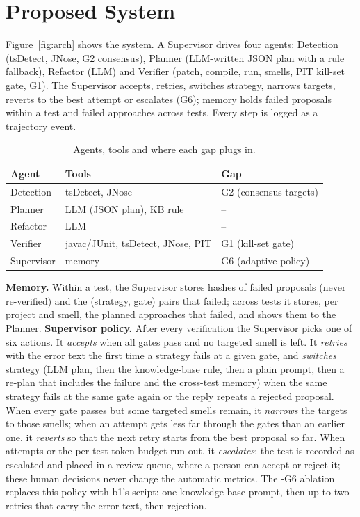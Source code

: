 \documentclass[conference]{IEEEtran}
\begin{document}
\section{Proposed System}
Figure~\ref{fig:arch} shows the system. A Supervisor drives four agents: Detection (tsDetect, JNose, G2 consensus),
Planner (LLM-written JSON plan with a rule fallback), Refactor (LLM) and Verifier (patch, compile, run, smells, PIT kill-set gate, G1).
The Supervisor accepts, retries, switches strategy, narrows targets, reverts to the best attempt or escalates (G6);
memory holds failed proposals within a test and failed approaches across tests. Every step is logged as a trajectory event.
\begin{table}[t]\centering\caption{Agents, tools and where each gap plugs in.}\label{tab:agents}\footnotesize
\begin{tabular}{@{}lll@{}}\toprule Agent & Tools & Gap\\\midrule
Detection & tsDetect, JNose & G2 (consensus targets)\\
Planner & LLM (JSON plan), KB rule & --\\
Refactor & LLM & --\\
Verifier & javac/JUnit, tsDetect, JNose, PIT & G1 (kill-set gate)\\
Supervisor & memory & G6 (adaptive policy)\\\bottomrule\end{tabular}\end{table}
\textbf{Memory.} Within a test, the Supervisor stores hashes of failed proposals (never re-verified) and the (strategy, gate) pairs that failed; across tests it stores, per project and smell, the planned approaches that failed, and shows them to the Planner.
\textbf{Supervisor policy.} After every verification the Supervisor picks one of six actions. It \emph{accepts} when all gates pass and no targeted smell is left. It \emph{retries} with the error text the first time a strategy fails at a given gate, and \emph{switches} strategy (LLM plan, then the knowledge-base rule, then a plain prompt, then a re-plan that includes the failure and the cross-test memory) when the same strategy fails at the same gate again or the reply repeats a rejected proposal.
When every gate passes but some targeted smells remain, it \emph{narrows} the targets to those smells; when an attempt gets less far through the gates than an earlier one, it \emph{reverts} so that the next retry starts from the best proposal so far. When attempts or the per-test token budget run out, it \emph{escalates}: the test is recorded as escalated and placed in a review queue, where a person can accept or reject it; these human decisions never change the automatic metrics.
The \textsf{-G6} ablation replaces this policy with \textsf{b1}'s script: one knowledge-base prompt, then up to two retries that carry the error text, then rejection.
\end{document}
